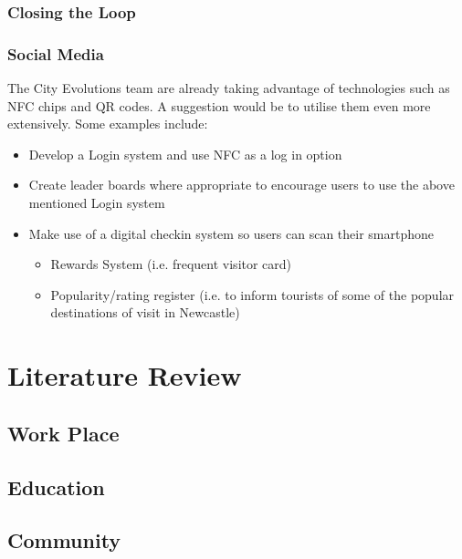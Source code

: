 \documentclass[a4,12pt]{article}
\begin{document}
\subsubsection{Closing the Loop}
\subsubsection{Social Media}
The City Evolutions team are already taking advantage of technologies such as NFC chips and QR codes. A suggestion would be to utilise them even more extensively. Some examples include:
\begin{itemize}
    \item{Develop a Login system and use NFC as a log in option}
    \item{Create leader boards where appropriate to encourage users to use the above mentioned Login system}
    \item{Make use of a digital checkin system so users can scan their smartphone
            \begin{itemize}
                \item{Rewards System (i.e. frequent visitor card)}
                \item{Popularity/rating register (i.e. to inform tourists of some of the popular destinations of visit in Newcastle)}
            \end{itemize}
        }
\end{itemize}
\section{Literature Review}

\subsection{Work Place}
\subsection{Education}
\subsection{Community}
\end{document}
